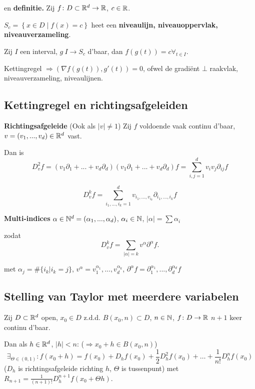 \documentclass{2wa40summary}
\begin{document}
			\gevolg en \textbf{definitie.} Zij $f\colon D \subset \mathbb{R}^d \to \mathbb{R}$, $c \in \mathbb{R}$. 
			
			$S_c = \left\{ x\in D \middle| f(x)=c \right\}$ heet een \textbf{niveaulijn, niveauoppervlak, niveauverzameling}.
			
			Zij $I$ een interval, $g\:  I\to S_c$ d'baar, dan $f(g(t))=c \forall_{t \in I}$.
			
			\opm Kettingregel $\Rightarrow (\nabla f(g(t)),g'(t)) = 0$, ofwel de gradi\"ent $\bot$ raakvlak, niveauverzameling, niveaulijnen.
			
		\subsection{Kettingregel en richtingsafgeleiden}
			
			 \textbf{Richtingsafgeleide} (Ook als $|v|\neq 1$)
			Zij $f$ voldoende vaak continu d'baar, $v=(v_1,...,v_d) \in \mathbb{R}^d$ vast.
			
			Dan is \[ D_v^2 f = (v_1 \partial_1 + ... + v_d \partial_d)(v_1 \partial_1 + ... + v_d \partial_d)f = \sum_{i,j=1}^{d} v_i v_j \partial_{ij}f \]
			
			\[ D_v^k f = \sum_{i_1,...,i_k=1}^{d} v_{{i_1},...,v_{i_k}} \partial_{i_1,...,i_k} f \]
			
			\nota \textbf{Multi-indices} $ \alpha \in \mathbb{N}^d = (\alpha_1 ,..., \alpha_d) $, $\alpha_i \in \mathbb{N}$, $ |\alpha| = \sum \alpha_i $
			
			zodat \[ D_v^k f = \sum_{|\alpha|=k} v^\alpha \partial^\alpha f. \]
			
			met $ \alpha_j = \#\{i_k | i_k = j\} $, $ v^\alpha = v_1^{\alpha_1} ,..., v_d^{\alpha_k} $, $ \partial^\alpha f = \partial_1^{\alpha_1},...,\partial_d^{\alpha_d} f $
			
		\subsection{Stelling van Taylor met meerdere variabelen}
			\theorem Zij  $D \subset \mathbb{R}^d$ open, $x_0 \in D$ z.d.d. $B(x_0,n) \subset D$, $n\in \mathbb{N}$, $f\colon D\to \mathbb{R}$ $n+1$ keer continu d'baar.
			
			Dan als $h \in \mathbb{R}^d$, $ |h|<n $: ($\Rightarrow x_0+h \in B(x_0,n)$)
			\[ \exists_{\Theta \in (0,1)}:f(x_0+h) = f(x_0) + D_h f(x_0) + \frac{1}{2} D_h^2 f(x_0) + \dots + \frac{1}{n!} D_h^n f(x_0) \]
			($D_h$ is richtingsafgeleide richting $h$, $\Theta$ is tussenpunt)
			met $R_{n+1} = \frac{1}{(n+1)!}D_h^{n+1} f(x_0 + \Theta h)$.
		
\end{document}
